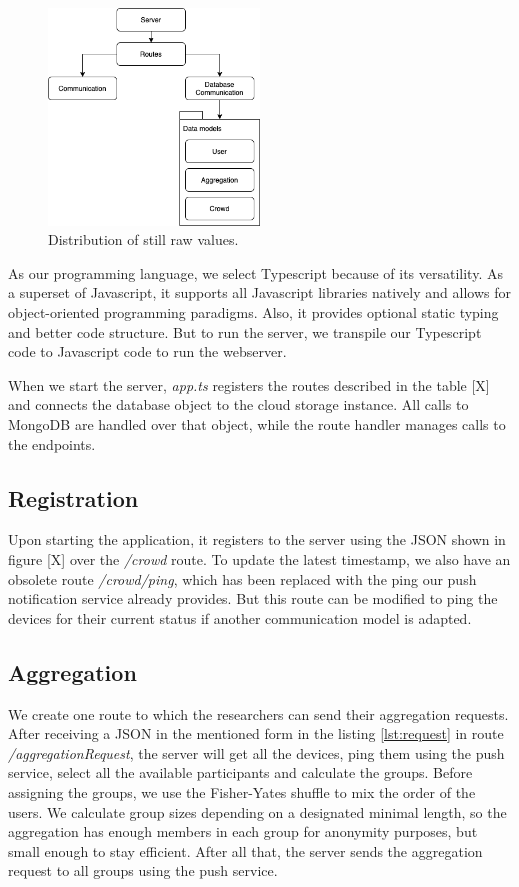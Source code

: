 \begin{figure}[htpb]
  \centering
  \includegraphics[width=0.5\textwidth]{figures/server}
  \caption{Distribution of still raw values.} \label{fig:server}
\end{figure}

As our programming language, we select Typescript because of its versatility. As a superset of Javascript, it supports all Javascript libraries natively and allows for object-oriented programming paradigms. Also, it provides optional static typing and better code structure. But to run the server, we transpile our Typescript code to Javascript code to run the webserver.

When we start the server, \textit{app.ts} registers the routes described in the table [X] and connects the database object to the cloud storage instance. All calls to MongoDB are handled over that object, while the route handler manages calls to the endpoints.

\subsection{Registration}

Upon starting the application, it registers to the server using the JSON shown in figure [X] over the \textit{/crowd} route. To update the latest timestamp, we also have an obsolete route \textit{/crowd/ping}, which has been replaced with the ping our push notification service already provides. But this route can be modified to ping the devices for their current status if another communication model is adapted.

\subsection{Aggregation}

We create one route to which the researchers can send their aggregation requests. After receiving a JSON in the mentioned form in the listing \ref{lst:request} in route \textit{/aggregationRequest}, the server will get all the devices, ping them using the push service, select all the available participants and calculate the groups. Before assigning the groups, we use the Fisher-Yates shuffle to mix the order of the users. We calculate group sizes depending on a designated minimal length, so the aggregation has enough members in each group for anonymity purposes, but small enough to stay efficient. After all that, the server sends the aggregation request to all groups using the push service.

